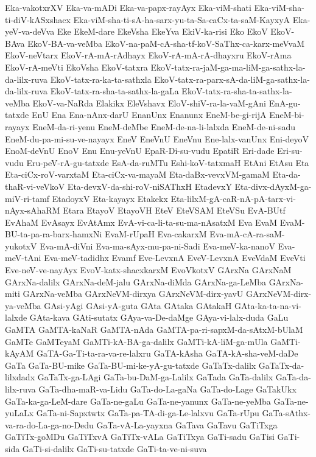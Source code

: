 {Eka-vakotxrXV
Eka-va-mADi
Eka-va-papx-rayAyx
Eka-viM-shati
Eka-viM-sha-ti-diV-kASxshacx
Eka-viM-sha-ti-sA-ha-sarx-yu-ta-Sa-caCx-ta-saM-KayxyA
Eka-yeV-va-deVva
Eke
EkeM-dare
EkeVsha
EkeYva
EkiV-ka-risi
Eko
EkoV
EkoV-BAva
EkoV-BA-va-veMba
EkoV-na-paM-cA-sha-tf-koV-SaThx-ca-karx-meVvaM
EkoV-neVtarx
EkoV-rA-mA-rAdhayx
EkoV-rA-mA-rA-dhayxru
EkoV-rAma
EkoV-rA-meVti
EkoVsha
EkoV-tatxra
EkoV-tatx-ra-jaM-ga-ma-liM-ga-sathx-la-da-lilx-ruva
EkoV-tatx-ra-ka-ta-sathxla
EkoV-tatx-ra-parx-sA-da-liM-ga-sathx-la-da-lilx-ruva
EkoV-tatx-ra-sha-ta-sathx-la-gaLa
EkoV-tatx-ra-sha-ta-sathx-la-veMba
EkoV-va-NaRda
Elakikx
EleVshavx
EloV-shiV-ra-la-vaM-gAni
EnA-gu-tatxde
EnU
Ena
Ena-nAnx-darU
EnanUnx
Enanunx
EneM-be-gi-rijA
EneM-bi-rayayx
EneM-da-ri-yenu
EneM-deMbe
EneM-de-na-li-lalxda
EneM-de-ni-sadu
EneM-du-pa-mi-su-ve-nayayx
EneV
EneVnU
EneVnu
Ene-lalx-vanUnx
Eni-deyoV
EnoM-deVnU
EnoV
Enu
Enu-yeVnU
EpaR-Di-su-vudu
EpatiR
Eri-dade
Eri-su-vudu
Eru-peV-rA-gu-tatxde
EsA-da-ruMTu
Eshi-koV-tatxmaH
EtAni
EtAsu
Eta
Eta-ciCx-roV-varxtaM
Eta-ciCx-va-mayaM
Eta-daBx-vevxVM-gamaM
Eta-da-thaR-vi-veVkoV
Eta-devxV-da-shi-roV-niSAThxH
EtadevxY
Eta-divx-dAyxM-ga-miV-ri-tamf
EtadoyxV
Eta-kayayx
Etakekx
Eta-lilxM-gA-caR-nA-pA-tarx-vi-nAyx-sAhaRM
Etara
EtayoV
EtayoVH
EteV
EteVSAM
EteVSu
EvA-BUtf
EvAhaM
EvAsayx
EvAtAmx
EvA-vi-ca-li-ta-su-ma-nAsatxM
Eva
EvaM
EvaM-BU-ta-pa-ra-barx-hamxNi
EvaM-rUpaH
Eva-cakarxM
Eva-mA-cA-ra-saM-yukotxV
Eva-mA-diVni
Eva-ma-sAyx-mu-pa-ni-Sadi
Eva-meV-ka-nanoV
Eva-meV-tAni
Eva-meV-tadidhx
Evamf
Eve-LevxnA
EveV-LevxnA
EveVdaM
EveVti
Eve-neV-ve-nayAyx
EvoV-katx-shacxkarxM
EvoVkotxV
GArxNa
GArxNaM
GArxNa-dalilx
GArxNa-deM-jalu
GArxNa-diMda
GArxNa-ga-LeMba
GArxNa-miti
GArxNa-veMba
GArxNeVM-dirxya
GArxNeVM-dirx-yavU
GArxNeVM-dirx-ya-veMba
GAsi-yAgi
GAsi-yA-guta
GAta
GAtaka
GAtakaH
GAta-ka-ta-na-vi-lalxde
GAta-kava
GAti-sutatx
GAya-va-De-daMge
GAya-vi-lalx-duda
GaLu
GaMTA
GaMTA-kaNaR
GaMTA-nAda
GaMTA-pa-ri-sapxM-da-sAtxM-bUlaM
GaMTe
GaMTeyaM
GaMTi-kA-BA-ga-dalilx
GaMTi-kA-liM-ga-mUla
GaMTi-kAyAM
GaTA-Ga-Ti-ta-ra-va-re-lalxru
GaTA-kAsha
GaTA-kA-sha-veM-daDe
GaTa
GaTa-BU-mike
GaTa-BU-mi-ke-yA-gu-tatxde
GaTaTx-dalilx
GaTaTx-da-lilxdadx
GaTaTx-ga-LAgi
GaTa-bu-DaM-ga-Lalilx
GaTada
GaTa-dalilx
GaTa-da-lilx-ruva
GaTa-dha-maR-va-Lidu
GaTa-do-La-gaNa
GaTa-do-Lage
GaTakUkx
GaTa-ka-ga-LeM-dare
GaTa-ne-gaLu
GaTa-ne-yanunx
GaTa-ne-yeMba
GaTa-ne-yuLaLx
GaTa-ni-Sapxtwtx
GaTa-pa-TA-di-ga-Le-lalxvu
GaTa-rUpu
GaTa-sAthx-va-ra-do-La-ga-no-Dedu
GaTa-vA-La-yayxna
GaTava
GaTavu
GaTiTxga
GaTiTx-goMDu
GaTiTxvA
GaTiTx-vALa
GaTiTxya
GaTi-sadu
GaTisi
GaTi-sida
GaTi-si-dalilx
GaTi-su-tatxde
GaTi-ta-ve-ni-suva
}
